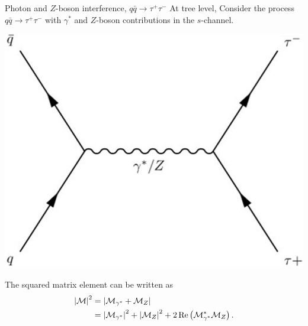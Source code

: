 \documentclass{../bredelebeamer}
\begin{document}
\begin{frame}{Photon and $Z$-boson interference, $q \bar q \longrightarrow \tau^+ \tau^- $}
    At tree level, Consider the process $q \bar q \longrightarrow \tau^+ \tau^- $ with $\gamma^*$ and $Z$-boson contributions in the $s$-channel.

    \begin{minipage}{0.35\textwidth}
        \begin{center}
            \includegraphics[width=0.95\linewidth]{DY.png}
        \end{center}
    \end{minipage}
    \hfill
    \begin{minipage}{0.57\textwidth}
        The squared matrix element can be written as
        \begin{equation}
            \begin{aligned}
                \abs{\mathcal{M}}^2 & =\abs{\mathcal{M}_{\gamma^*}+\mathcal{M}_{Z}}
                \\&= \abs{\mathcal{M}_{\gamma^*}}^2 + \abs{\mathcal{M}_{Z}}^2 + 2\Re\left( \mathcal{M}_{\gamma^*}^*\mathcal{M}_{Z} \right).    \notag
            \end{aligned}
        \end{equation}
    \end{minipage}
    \pause


\end{frame}
\end{document}
